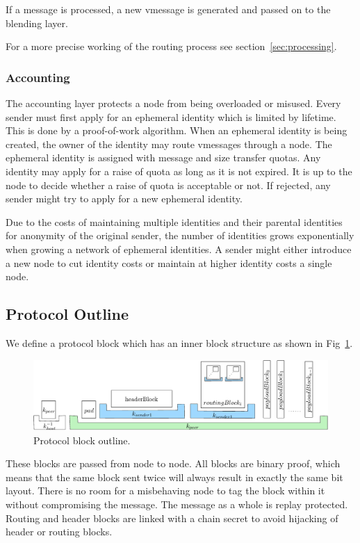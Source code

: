 \documentclass[runningheads]{llncs}
\begin{document}
If a message is processed, a new vmessage is generated and passed on to the blending layer.

For a more precise working of the routing process see section~\ref{sec:processing}.

\subsubsection{Accounting}
The accounting layer protects a node from being overloaded or misused. Every sender must first apply for an ephemeral identity which is limited by lifetime. This is done by a proof-of-work algorithm. When an ephemeral identity is being created, the owner of the identity may route vmessages through a node. The ephemeral identity is assigned with message and size transfer quotas. Any identity may apply for a raise of quota as long as it is not expired. It is up to the node to decide whether a raise of quota is acceptable or not. If rejected, any sender might try to apply for a new ephemeral identity.

Due to the costs of maintaining multiple identities and their parental identities for anonymity of the original sender, the number of identities grows exponentially when growing a network of ephemeral identities. A sender might either introduce a new node to cut identity costs or maintain at higher identity costs a single node.

\subsection{Protocol Outline}
We define a protocol block which has an inner block structure as shown in Fig~\ref{fig:blocks}.

\begin{figure}[htb]
	\centering
	\includegraphics[width=\columnwidth]{../../inc/blockLayoutSimplified}
	\caption{Protocol block outline.}
	\label{fig:blocks}
\end{figure}

These blocks are passed from node to node. All blocks are binary proof, which means that the same block sent twice will always result in exactly the same bit layout. There is no room for a misbehaving node to tag the block within it without compromising the message. The message as a whole is replay protected. Routing and header blocks are linked with a chain secret to avoid hijacking of header or routing blocks.
\end{document}
